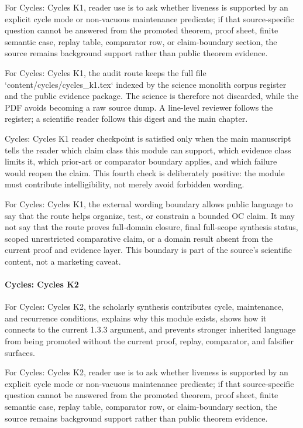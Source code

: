 For Cycles: Cycles K1, reader use is to ask whether liveness is supported by an explicit cycle mode or non-vacuous maintenance predicate; if that source-specific question cannot be answered from the promoted theorem, proof sheet, finite semantic case, replay table, comparator row, or claim-boundary section, the source remains background support rather than public theorem evidence.


For Cycles: Cycles K1, the audit route keeps the full file `content/cycles/cycles\_k1.tex` indexed by the science monolith corpus register and the public evidence package. The science is therefore not discarded, while the PDF avoids becoming a raw source dump. A line-level reviewer follows the register; a scientific reader follows this digest and the main chapter.


Cycles: Cycles K1 reader checkpoint is satisfied only when the main manuscript tells the reader which claim class this module can support, which evidence class limits it, which prior-art or comparator boundary applies, and which failure would reopen the claim. This fourth check is deliberately positive: the module must contribute intelligibility, not merely avoid forbidden wording.


For Cycles: Cycles K1, the external wording boundary allows public language to say that the route helps organize, test, or constrain a bounded OC claim. It may not say that the route proves full-domain closure, final full-scope synthesis status, scoped unrestricted comparative claim, or a domain result absent from the current proof and evidence layer. This boundary is part of the source's scientific content, not a marketing caveat.


\paragraph{Cycles: Cycles K2}

For Cycles: Cycles K2, the scholarly synthesis contributes cycle, maintenance, and recurrence conditions, explains why this module exists, shows how it connects to the current 1.3.3 argument, and prevents stronger inherited language from being promoted without the current proof, replay, comparator, and falsifier surfaces.


For Cycles: Cycles K2, reader use is to ask whether liveness is supported by an explicit cycle mode or non-vacuous maintenance predicate; if that source-specific question cannot be answered from the promoted theorem, proof sheet, finite semantic case, replay table, comparator row, or claim-boundary section, the source remains background support rather than public theorem evidence.


